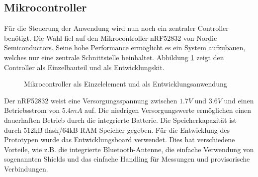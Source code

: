 \subsection{Mikrocontroller} \label{sec:microcontrollerHardware}
Für die Steuerung der Anwendung wird nun noch ein zentraler Controller benötigt. Die Wahl fiel auf den Mikrocontroller nRF52832 von Nordic Semiconductors. Seine hohe Performance ermöglicht es ein System aufzubauen, welches nur eine zentrale Schnittstelle beinhaltet. Abbildung \ref{fig:nRF52832} zeigt den Controller als Einzelbauteil und als Entwicklungskit.


\begin{figure}[H]
	\centering
	\quad
	\quad
	\caption[Mikrocontroller NRF52832  \cite{nRF52832}  \cite{nRF52-DK}]{Mikrocontroller als Einzelelement und als Entwicklungsanwendung}
	\label{fig:nRF52832}
\end{figure}

Der nRF52832 weist eine Versorgungsspannung zwischen $1.7V$ und $3.6V$ und einen Betriebsstrom von $5.4mA$ auf. Die niedrigen Versorgungswerte ermöglichen einen dauerhaften Betrieb durch die integrierte Batterie. Die Speicherkapazität ist durch 512kB flash/64kB RAM Speicher gegeben. Für die Entwicklung des Prototypen wurde das Entwicklungsboard verwendet. Dies hat verschiedene Vorteile, wie z.B. die integrierte Bluetooth-Antenne, die einfache Verwendung von sogenannten Shields und das einfache Handling für Messungen und provisorische Verbindungen.